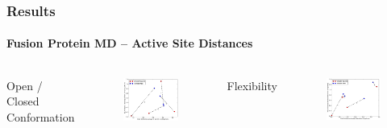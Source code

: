 \documentclass[english]{beamer}
\begin{document}

\begin{frame}
    \frametitle{Results}
    \framesubtitle{Fusion Protein MD -- Active Site Distances}  

    \vfill

    \begin{columns}[]
        \vfill
        \centering
        Open / Closed Conformation
        \begin{figure}
            \includegraphics[width=\textwidth]{figures/CitAP_BSLA_distance/BSLA_CitAP_analyzed_with_average_of_last_50_ns.pdf}  
        \end{figure}         

        \vfill
        \centering
        Flexibility
        \begin{figure}
            \includegraphics[width=\textwidth]{figures/CitAP_BSLA_distance/BSLA_CitAP_analyzed_with_standard_deviation.pdf}  
        \end{figure}      

    \end{columns}    

    \vfill 

\end{frame}        
\end{document}
